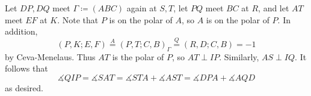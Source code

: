 Let $DP,DQ$ meet $\Gamma\coloneqq(ABC)$ again at $S,T$, let $PQ$ meet $BC$ at $R$, and let $AT$ meet $EF$ at $K$. Note that $P$ is on the polar of $A$, so $A$ is on the polar of $P$. In addition,
\[
	(P,K;E,F)\stackrel{A}{=}(P,T;C,B)_\Gamma\stackrel{Q}{=}(R,D;C,B)=-1
\]
by Ceva-Menelaus. Thus $AT$ is the polar of $P$, so $AT\perp IP$. Similarly, $AS\perp IQ$. It follows that
\[
	\measuredangle{QIP}=\measuredangle{SAT}=\measuredangle{STA}+\measuredangle{AST}=\measuredangle{DPA}+\measuredangle{AQD}
\]
as desired.
